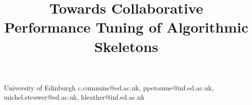 \documentclass[nonatbib,preprint,nocopyrightspace,9pt]{sigplanconf}
\begin{document}
\setlength{\pdfpageheight}{\paperheight}
\setlength{\pdfpagewidth}{\paperwidth}






\title{Towards Collaborative Performance Tuning of Algorithmic Skeletons}


           {University of Edinburgh}
           {c.cummins@ed.ac.uk, ppetoume@inf.ed.ac.uk, michel.steuwer@ed.ac.uk, hleather@inf.ed.ac.uk}

\maketitle
\end{document}
